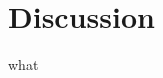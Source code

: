 \documentclass[
11pt, %
a4paper, %
oneside, %
headinclude,footinclude, %
BCOR5mm, %
]{scrartcl}
\begin{document}

\section{Discussion}

what


\renewcommand{\refname}{\spacedlowsmallcaps{References}} %




\end{document}
